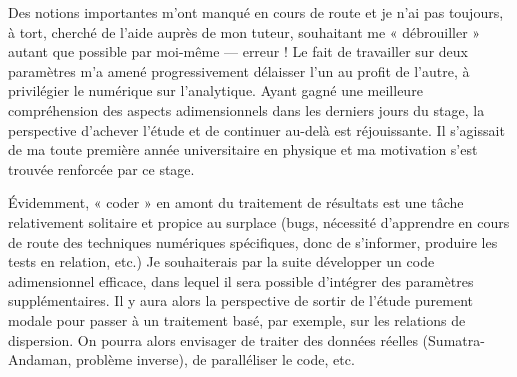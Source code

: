 Des notions importantes m'ont manqué en cours de route et je n'ai pas toujours, à tort, cherché de l'aide auprès de mon tuteur, souhaitant me « débrouiller » autant que possible par moi-même — erreur ! Le fait de travailler sur deux paramètres m'a amené progressivement délaisser l'un au profit de l'autre, \ie à privilégier le numérique sur l'analytique. Ayant gagné une meilleure compréhension des aspects adimensionnels dans les derniers jours du stage, la perspective d'achever l'étude et de continuer au-delà est réjouissante. Il s'agissait de ma toute première année universitaire en physique et ma motivation s'est trouvée renforcée par ce stage.

Évidemment, « coder » en amont du traitement de résultats est une tâche relativement solitaire et propice au surplace (bugs, nécessité d'apprendre en cours de route des techniques numériques spécifiques, donc de s'informer, produire les tests en relation, etc.) Je souhaiterais par la suite développer un code adimensionnel efficace, dans lequel il sera possible d'intégrer des paramètres supplémentaires. Il y aura alors la perspective de sortir de l'étude purement modale pour passer à un traitement basé, par exemple, sur les relations de dispersion. On pourra alors envisager de traiter des données réelles (Sumatra-Andaman, problème inverse), de paralléliser le code, etc.

